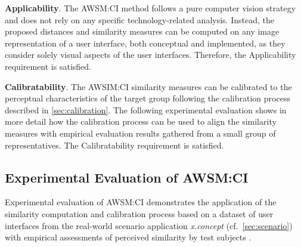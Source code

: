 \textbf{Applicability}. The AWSM:CI method follows a pure computer vision strategy and does not rely on any specific technology-related analysis.
Instead, the proposed distances and similarity measures can be computed on any image representation of a user interface, both conceptual and implemented, as they consider solely visual aspects of the user interfaces.
Therefore, the Applicability requirement is satisfied.

\textbf{Calibratability}. The AWSIM:CI similarity measures can be calibrated to the perceptual characteristics of the target group following the calibration process described in \cref{sec:calibration}.
The following experimental evaluation shows in more detail how the calibration process can be used to align the similarity measures with empirical evaluation results gathered from a small group of representatives.
The Calibratability requirement is satisfied.

\vspace{-10pt}
\hypertarget{sec:ci.experiment}{%
\subsection{Experimental Evaluation of AWSM:CI}\label{sec:ci.experiment}}
\vspace{10pt}

Experimental evaluation of AWSM:CI demonstrates the application of the similarity computation and calibration process based on a dataset of user interfaces from the real-world scenario application \emph{x.concept} (cf.~\cref{sec:scenario}) with empirical assessments of perceived similarity by test subjects \autocite{Heil2016Similarity}.

